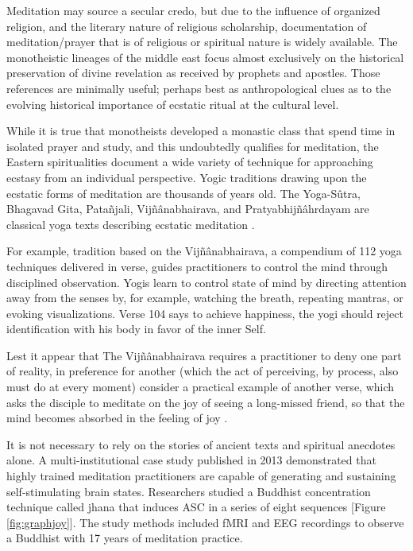 \documentclass{UIdahoMastersThesis}
\begin{document}
Meditation may source a secular credo, but due to the influence of organized religion, and the literary nature of religious scholarship, documentation of meditation/prayer that is of religious or spiritual nature is widely available. The monotheistic lineages of the middle east focus almost exclusively on the historical preservation of divine revelation as received by prophets and apostles. Those references are minimally useful; perhaps best as anthropological clues as to the evolving historical importance of ecstatic ritual at the cultural level.
 
While it is true that monotheists developed a monastic class that spend time in isolated prayer and study, and this undoubtedly qualifies for meditation, the Eastern spiritualities document a wide variety of technique for approaching ecstasy from an individual perspective. Yogic traditions drawing upon the ecstatic forms of meditation are thousands of years old. The Yoga-S\^{u}tra, Bhagavad Gita, Pata\~{n}jali, Vij\~{n}\^{a}nabhairava, and Pratyabhij\~{n}\^{a}hrdayam are classical yoga texts describing ecstatic meditation \cite{waelde_dissociation_2004}.

For example, tradition based on the Vij\~{n}\^{a}nabhairava, a compendium of 112 yoga techniques delivered in verse, guides practitioners to control the mind through disciplined observation. Yogis learn to control state of mind by directing attention away from the senses by, for example, watching the breath, repeating mantras, or evoking visualizations. Verse 104 says to achieve happiness, the yogi should reject identification with his body in favor of the inner Self. 

Lest it appear that The Vij\~{n}\^{a}nabhairava requires a practitioner to deny one part of reality, in preference for another (which the act of perceiving, by process, also must do at every moment) consider a practical example of another verse, which asks the disciple to meditate on the joy of seeing a long-missed friend, so that the mind becomes absorbed in the feeling of joy \cite{singh_vijnanabhairava_2002}.

It is not necessary to rely on the stories of ancient texts and spiritual anecdotes alone. A multi-institutional case study published in 2013 demonstrated that highly trained meditation practitioners are capable of generating and sustaining self-stimulating brain states. Researchers studied a Buddhist concentration technique called jhana that induces \ac{ASC} in a series of eight sequences [Figure \ref{fig:graphjoy}]. The study methods included \ac{fMRI} and \ac{EEG} recordings to observe a Buddhist with 17 years of meditation practice. 
\end{document}
